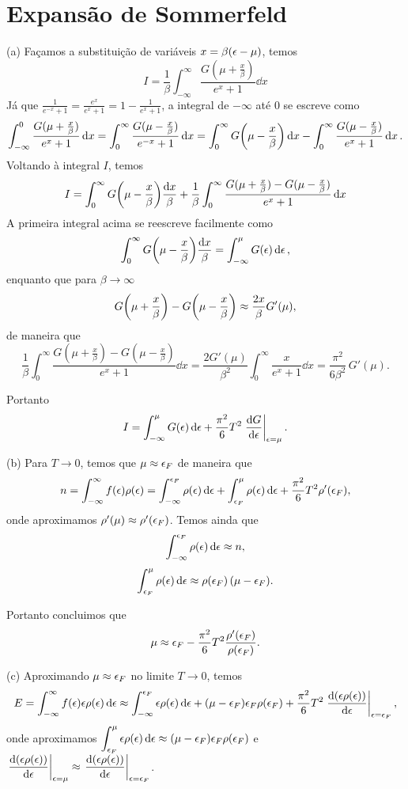 \documentclass[a4paper,10pt]{article}
\begin{document}
\pagebreak

\section{Expansão de Sommerfeld}

(a) Façamos a substituição de variáveis $x = \beta(\epsilon - \mu)$, temos
$$
I = \frac{1}{\beta} \int_{-\infty}^{\infty} \frac{G(\mu + \frac{x}{\beta})}{e^{x} + 1} \dd{x}
$$
Já que $\displaystyle{\frac{1}{e^{-x} + 1} = \frac{e^x}{e^x + 1} = 1 - \frac{1}{e^x + 1}}$, a integral de $-\infty$ até $0$ se escreve como
$$
\int_{-\infty}^0 \frac{G(\mu + \frac{x}{\beta})}{e^{x} + 1} \dd{x} =
\int_0^{\infty} \frac{G(\mu - \frac{x}{\beta})}{e^{-x} + 1} \dd{x} =
\int_0^{\infty} G\qty(\mu - \frac{x}{\beta}) \dd{x} -
\int_0^{\infty} \frac{G(\mu - \frac{x}{\beta})}{e^{x} + 1} \dd{x}.
$$
Voltando à integral $I$, temos
$$
I =
\int_0^{\infty} G\qty(\mu - \frac{x}{\beta}) \frac{\dd{x}}{\beta} +
\frac{1}{\beta}
\int_0^{\infty}\frac{G(\mu + \frac{x}{\beta}) - G(\mu - \frac{x}{\beta})}{e^x + 1}\dd{x}
$$
A primeira integral acima se reescreve facilmente como
$$
\int_0^\infty G\qty(\mu - \frac{x}{\beta}) \frac{\dd{x}}{\beta} =
\int_{-\infty}^\mu G(\epsilon) \dd{\epsilon},
$$
enquanto que para $\beta \to \infty$
$$
G\qty(\mu + \frac{x}{\beta}) - G\qty(\mu - \frac{x}{\beta}) \approx \frac{2x}{\beta} G'(\mu),
$$
de maneira que
$$
\frac{1}{\beta}
\int_0^{\infty}\frac{G(\mu + \frac{x}{\beta}) - G(\mu - \frac{x}{\beta})}{e^x + 1}\dd{x}=
\frac{2 G'(\mu)}{\beta^2}
\int_0^{\infty}\frac{x}{e^x + 1}\dd{x} =
\frac{\pi^2}{6 \beta^2} \, G'(\mu).
$$

Portanto
$$
I = \int_{-\infty}^{\mu} G(\eps) \dd{\eps} + \frac{\pi^2}{6} T^2 \eval{\dv{G}{\eps}}_{\eps = \mu}.
$$

(b) Para $T \to 0$, temos que $\mu \approx \epsilon_F$ de maneira que
$$
n = \int_{-\infty}^{\infty} f(\epsilon) \rho(\epsilon) =
\int_{-\infty}^{\epsilon_F} \rho(\epsilon) \dd{\epsilon} +
\int_{\epsilon_F}^{\mu} \rho(\epsilon) \dd{\epsilon} +
\frac{\pi^2}{6} T^2 \rho'(\epsilon_F),
$$
onde aproximamos $\rho'(\mu) \approx \rho'(\epsilon_F)$. Temos ainda que
$$
\int_{-\infty}^{\epsilon_F} \rho(\epsilon) \dd{\epsilon} \approx n,
$$
$$
\int_{\epsilon_F}^{\mu} \rho(\epsilon) \dd{\epsilon} \approx \rho(\epsilon_F) \, (\mu - \epsilon_F).
$$

Portanto concluimos que
\begin{equation} \label{eq:chempot}
\mu \approx \epsilon_F - \frac{\pi^2}{6} T^2 \frac{\rho'(\epsilon_F)}{\rho(\epsilon_F)}.
\end{equation}

(c) Aproximando $\mu \approx \epsilon_F$ no limite $T \to 0$, temos
$$
E = \int_{-\infty}^{\infty} f(\eps) \eps \rho(\eps) \dd{\eps} \approx
\int_{-\infty}^{\eps_F} \eps \rho(\eps) \dd{\eps} +
(\mu - \eps_F) \eps_F \rho(\eps_F) +
\frac{\pi^2}{6} T^2 \eval{\dv{(\eps \rho(\eps))}{\eps}}_{\eps = \eps_F},
$$
onde aproximamos $\displaystyle{\int_{\epsilon_F}^{\mu} \epsilon\rho(\epsilon) \dd{\epsilon} \approx (\mu - \epsilon_F) \epsilon_F \rho(\epsilon_F)}$ e $\displaystyle{\eval{\dv{(\eps \rho(\eps))}{\eps}}_{\eps = \mu} \approx \eval{\dv{(\eps \rho(\eps))}{\eps}}_{\eps = \eps_F}}$.
\end{document}
